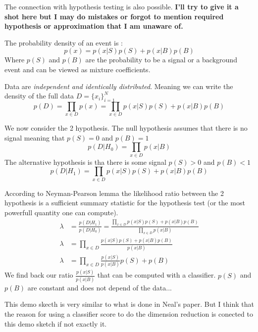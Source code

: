 The connection with hypothesis testing is also possible.
\textbf{I'll try to give it a shot here but I may do mistakes or forgot to mention required hypothesis or approximation that I am unaware of.}

The probability density of an event is :
\begin{equation}
 	p(x) = p(x|S) p(S) + p(x|B) p(B)
\end{equation} 
Where $p(S)$ and $p(B)$ are the probability to be a signal or a background event and can be viewed as mixture coefficients.

Data are \emph{independent and identically distributed}.
Meaning we can write the density of the full data $D = \{x_i\}_{i=1}^N$
\begin{equation}
	p(D) = \prod_{x\in D} p(x) = \prod_{x\in D} p(x|S) p(S) + p(x|B) p(B)
\end{equation}

We now consider the 2 hypothesis.
The null hypothesis assumes that there is no signal meaning that $p(S) = 0$ and $p(B) = 1$
\begin{equation}
	p(D |H_0) = \prod_{x\in D} p(x|B)
\end{equation}
The alternative hypothesis is tha there is some signal $p(S) > 0$ and $p(B) < 1$
\begin{equation}
	p(D | H_1) = \prod_{x\in D} p(x|S) p(S) + p(x|B) p(B)
\end{equation}

According to Neyman-Pearson lemma \cite{neyman_pearson_1933} the likelihood ratio between the 2 hypothesis is a sufficient summary statistic for the hypothesis test (or the most powerfull quantity one can compute).
\begin{align}
	\lambda & = \frac{p(D | H_1)}{p(D |H_0)} = \frac{\prod_{x\in D} p(x|S) p(S) + p(x|B) p(B)}{\prod_{x\in D} p(x|B)} \\
	\lambda & = \prod_{x\in D} \frac{ p(x|S) p(S) + p(x|B) p(B)}{p(x|B)} \\
	\lambda & = \prod_{x\in D}  \frac{p(x|S)}{p(x|B)}  p(S) + p(B)
\end{align}
We find back our ratio $\frac{p(x|S)}{p(x|B)}$ that can be computed with a classifier.
$p(S)$ and $p(B)$ are constant and does not depend of the data...

This demo skecth is very similar to what is done in Neal's paper.
But I think that the reason for using a classifier score to do the dimension reduction is conected to this demo sketch if not exactly it. 



